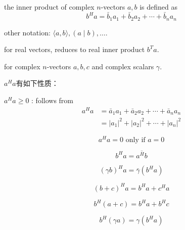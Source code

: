 \begin{definition}
    the inner product of complex $ n $-vectors $ a, b $ is defined as
\begin{equation}
b^{H} a=\bar{b}_{1} a_{1}+\bar{b}_{2} a_{2}+\cdots+\bar{b}_{n} a_{n}
\end{equation}
\end{definition}

other notation: $ \langle a, b\rangle,(a \mid b), \ldots $.

for real vectors, reduces to real inner product $ b^{T} a $.

for complex $ n $-vectors $ a, b, c $ and complex scalars $ \gamma $.

$a^H a$有如下性质：
\begin{theorem}
    $ a^{H} a \geq 0 $ : follows from
\begin{equation}
\begin{aligned}
a^{H} a &=\bar{a}_{1} a_{1}+\bar{a}_{2} a_{2}+\cdots+\bar{a}_{n} a_{n} \\
&=\left|a_{1}\right|^{2}+\left|a_{2}\right|^{2}+\cdots+\left|a_{n}\right|^{2}
\end{aligned}
\end{equation}

\end{theorem}

\begin{theorem}
    \begin{equation} a^{H} a=0 \text{ only if } a=0 \end{equation}
\end{theorem}

\begin{theorem}
    \begin{equation} b^{H} a=\overline{a^{H} b} \end{equation}
\end{theorem}

\begin{theorem}
    \begin{equation} (\gamma b)^{H} a=\bar{\gamma}\left(b^{H} a\right) \end{equation}
\end{theorem}

\begin{theorem}
    \begin{equation} (b+c)^{H} a=b^{H} a+c^{H} a \end{equation}
\end{theorem}

\begin{theorem}
    \begin{equation} b^{H}(a+c)=b^{H} a+b^{H} c \end{equation}
\end{theorem}

\begin{theorem}
    \begin{equation} b^{H}(\gamma a)=\gamma\left(b^{H} a\right) \end{equation}
\end{theorem}